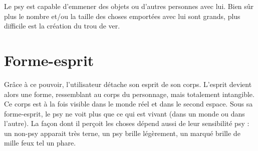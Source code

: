 \begin{multicols*}{2}
Le psy est capable d'emmener des objets ou d'autres personnes avec lui. Bien sûr plus le nombre et/ou la taille des choses emportées avec lui sont grands, plus difficile est la création du trou de ver.

\section{Forme-esprit}

Grâce à ce pouvoir, l'utilisateur détache son esprit de son corps. L'esprit devient alors une forme, ressemblant au corps du personnage, mais totalement intangible. Ce corps est à la fois visible dans le monde réel et dans le second espace. Sous sa forme-esprit, le psy ne voit plus que ce qui est vivant (dans un monde ou dans l'autre). La façon dont il perçoit les choses dépend aussi de leur sensibilité psy : un non-psy apparait très terne, un psy brille légèrement, un marqué brille de mille feux tel un phare.

\end{multicols*}
